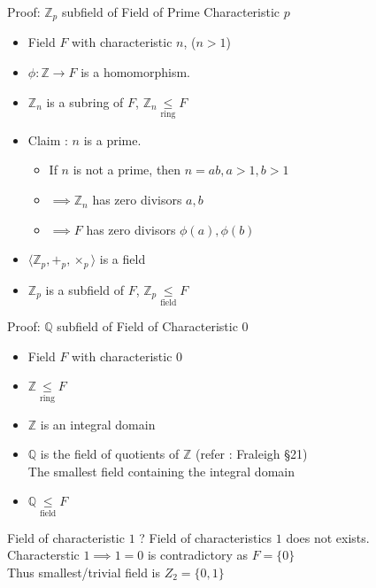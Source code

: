 \documentclass{beamer}
\begin{document}
\begin{frame}{Proof: $\mathbb{Z}_p$ subfield of Field of Prime Characteristic $p$}
\begin{itemize}
	\item Field $F$ with characteristic $n$, ($n > 1$)
	\item $\phi : \mathbb{Z} \to F$ is a homomorphism.
	\item $\mathbb{Z}_n$ is a subring of $F$, $\mathbb{Z}_n \underset{\text{ring}}{\le} F$
	\item Claim : $n$ is a prime.
	\begin{itemize}
		\item If $n$ is not a prime, then $n = ab, a>1,b>1$
		\item $\implies \mathbb{Z}_n$ has zero divisors $a,b$
		\item $\implies F$ has zero divisors $\phi(a),\phi(b)$
	\end{itemize}
	\item $\langle \mathbb{Z}_p,+_p,\times_p \rangle$ is a field
	\item $\mathbb{Z}_p$ is a subfield of $F$, $\mathbb{Z}_p \underset{\text{field}}{\le} F$
\end{itemize}
\end{frame}

\begin{frame}{Proof: $\mathbb{Q}$ subfield of Field of Characteristic $0$}
\begin{itemize}
	\item Field $F$ with characteristic $0$
	\item $\mathbb{Z} \underset{\text{ring}}{\le} F$
	\item $\mathbb{Z}$ is an integral domain
	\item $\mathbb{Q}$ is the field of quotients of $\mathbb{Z}$ (refer : Fraleigh \S21)\\
		The smallest field containing the integral domain
	\item $\mathbb{Q} \underset{\text{field}}{\le} F$
\end{itemize}
\begin{block}{Field of characteristic $1$ ?}
	Field of characteristics $1$ does not exists.\\
	Characterstic $1 \implies 1 = 0$ is contradictory as $F = \{ 0 \}$\\
	Thus smallest/trivial field is $Z_2 = \{ 0 ,1 \}$
\end{block}
\end{frame}
\end{document}
